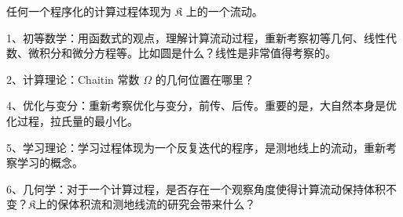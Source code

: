 \documentclass[a4paper,12pt]{article}
\begin{document}
任何一个程序化的计算过程体现为 $\mathfrak{K}$ 上的一个流动。

1、初等数学：用函数式的观点，理解计算流动过程，重新考察初等几何、线性代数、微积分和微分方程等。比如圆是什么？线性是非常值得考察的。

2、计算理论：Chaitin 常数 $\Omega$ 的几何位置在哪里？

4、优化与变分：重新考察优化与变分，前传、后传。重要的是，大自然本身是优化过程，拉氏量的最小化。

5、学习理论：学习过程体现为一个反复迭代的程序，是测地线上的流动，重新考察学习的概念。

6、几何学：对于一个计算过程，是否存在一个观察角度使得计算流动保持体积不变？$\mathfrak{K}$上的保体积流和测地线流的研究会带来什么？
\end{document}
